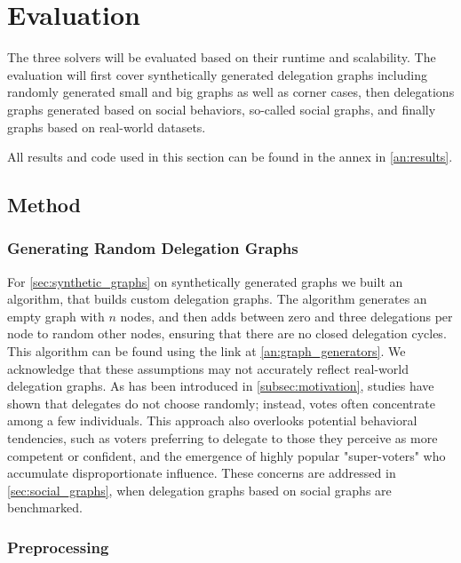 \graphicspath{ {./figures/} }

\chapter{Evaluation}
\label{chap:evaluation}

The three solvers will be evaluated based on their runtime and scalability. The evaluation will first cover synthetically generated delegation graphs including randomly generated small and big graphs as well as corner cases, then delegations graphs generated based on social behaviors, so-called social graphs, and finally graphs based on real-world datasets.

All results and code used in this section can be found in the annex in \cref{an:results}. 

\section{Method}

\subsection{Generating Random Delegation Graphs}

For \cref{sec:synthetic_graphs} on synthetically generated graphs we built an algorithm, that builds custom delegation graphs. The algorithm generates an empty graph with $n$ nodes, and then adds between zero and three delegations per node to random other nodes, ensuring that there are no closed delegation cycles. This algorithm can be found using the link at \cref{an:graph_generators}. We acknowledge that these assumptions may not accurately reflect real-world delegation graphs. As has been introduced in \cref{subsec:motivation}, studies have shown that delegates do not choose randomly; instead, votes often concentrate among a few individuals. This approach also overlooks potential behavioral tendencies, such as voters preferring to delegate to those they perceive as more competent or confident, and the emergence of highly popular "super-voters" who accumulate disproportionate influence. These concerns are addressed in \cref{sec:social_graphs}, when delegation graphs based on social graphs are benchmarked. 

\subsection{Preprocessing}

